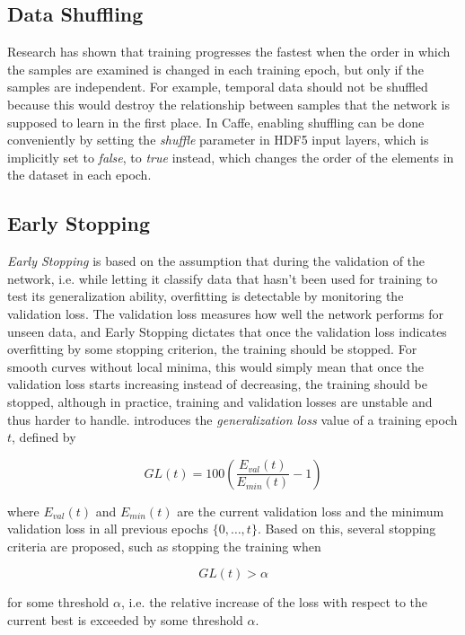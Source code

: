 	\subsection{Data Shuffling}
Research \cite{shuffling, lecun_norm} has shown that training progresses the fastest when the order in which the samples are examined is changed in each training epoch, but only if the samples are independent. For example, temporal data should not be shuffled because this would destroy the relationship between samples that the network is supposed to learn in the first place. In Caffe, enabling shuffling can be done conveniently by setting the \textit{shuffle} parameter in HDF5 input layers, which is implicitly set to \textit{false}, to \textit{true} instead, which changes the order of the elements in the dataset in each epoch.


	\subsection{Early Stopping}
\textit{Early Stopping} is based on the assumption that during the validation of the network, i.e. while letting it classify data that hasn't been used for training to test its generalization ability, overfitting is detectable by monitoring the validation loss. The validation loss measures how well the network performs for unseen data, and Early Stopping dictates that once the validation loss indicates overfitting by some stopping criterion, the training should be stopped. For smooth curves without local minima, this would simply mean that once the validation loss starts increasing instead of decreasing, the training should be stopped, although in practice, training and validation losses are unstable and thus harder to handle. \cite{early_stopping} introduces the \textit{generalization loss} value of a training epoch $t$, defined by

\[ GL(t) = 100 \left ( \frac{E_{val}(t)}{E_{min}(t)} - 1 \right ) \]

\noindent where $E_{val}(t)$ and $E_{min}(t)$ are the current validation loss and the minimum validation loss in all previous epochs $\{0, \dots, t\}$. Based on this, several stopping criteria are proposed, such as stopping the training when 

\[ GL(t) > \alpha \]

\noindent for some threshold $\alpha$, i.e. the relative increase of the loss with respect to the current best is exceeded by some threshold $\alpha$.\\

